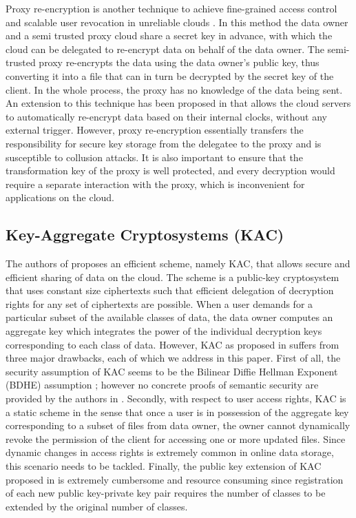 Proxy re-encryption is another technique to achieve fine-grained access control and scalable user revocation in unreliable clouds \cite{ateniese2006improved}. In this method the data owner and a semi trusted proxy cloud share a secret key in advance, with which the cloud can be delegated to re-encrypt data on behalf of the data owner. The semi-trusted proxy re-encrypts the data using the data owner's public key, thus converting it into a file that can in turn be decrypted by the secret key of the client. In the whole process, the proxy has no knowledge of the data being sent. An extension to this technique has been proposed in \cite{liu2011reliable} that allows the cloud servers to automatically re-encrypt data based on their internal clocks, without any external trigger. However, proxy re-encryption essentially transfers the responsibility for secure key storage from the delegatee to the proxy and is susceptible to collusion attacks. It is also important to ensure that the transformation key of the proxy is 
well protected, and every decryption would require a separate interaction with the proxy, which is inconvenient for applications on the cloud.

\subsection{Key-Aggregate Cryptosystems (KAC)}
\label{subsec:aggregate}

The authors of \cite{chu2014key} proposes an efficient scheme, namely KAC, that allows secure and efficient sharing of data on the cloud. The scheme is a public-key cryptosystem that uses constant size ciphertexts such that efficient delegation of decryption rights for any set of ciphertexts are possible. When a user demands for a particular subset of the available classes of data, the data owner computes an aggregate key which integrates the power of the individual decryption keys corresponding to each class of data. However, KAC as proposed in \cite{chu2014key} suffers from three major drawbacks, each of which we address in this paper. First of all, the security assumption of KAC seems to be the Bilinear Diffie Hellman Exponent (BDHE) assumption \cite{miller1986use}; however no concrete proofs of semantic security are provided by the authors in \cite{chu2014key}. Secondly, with respect to user access rights, KAC is a static scheme in the sense that once a user is in possession of the aggregate key corresponding to a subset of files from data owner, the owner cannot dynamically revoke the permission of the client for accessing one or more updated files. Since dynamic changes in access rights is extremely common in online data storage, this scenario needs to be tackled. Finally, the public key extension of KAC proposed in \cite{chu2014key} is extremely cumbersome and resource consuming since registration of each new public key-private key pair requires the number of classes to be extended by the original number of classes. 






